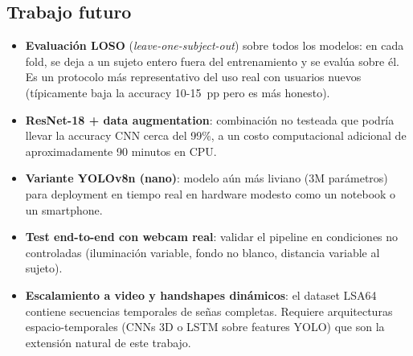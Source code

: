 \documentclass[a4paper,11pt]{article}
\begin{document}
\subsection{Trabajo futuro}

\begin{itemize}[itemsep=2pt]
    \item \textbf{Evaluación LOSO} (\textit{leave-one-subject-out}) sobre todos los modelos: en cada fold, se deja a un sujeto entero fuera del entrenamiento y se evalúa sobre él. Es un protocolo más representativo del uso real con usuarios nuevos (típicamente baja la accuracy 10-15~pp pero es más honesto).
    \item \textbf{ResNet-18 + data augmentation}: combinación no testeada que podría llevar la accuracy CNN cerca del 99\%, a un costo computacional adicional de aproximadamente 90 minutos en CPU.
    \item \textbf{Variante YOLOv8n (nano)}: modelo aún más liviano (3M parámetros) para deployment en tiempo real en hardware modesto como un notebook o un smartphone.
    \item \textbf{Test end-to-end con webcam real}: validar el pipeline en condiciones no controladas (iluminación variable, fondo no blanco, distancia variable al sujeto).
    \item \textbf{Escalamiento a video y handshapes dinámicos}: el dataset LSA64~\cite{ronchetti2016lsa64} contiene secuencias temporales de señas completas. Requiere arquitecturas espacio-temporales (CNNs 3D o LSTM sobre features YOLO) que son la extensión natural de este trabajo.
\end{itemize}
\end{document}
